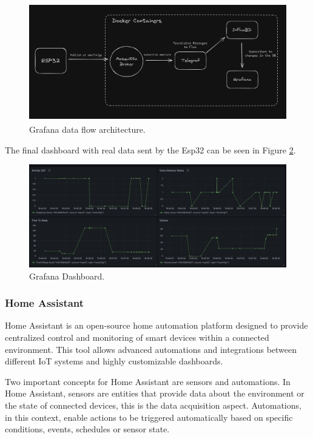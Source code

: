 \begin{figure}[H]
    \centering
    \includegraphics*[scale = 0.28]{Images/GrafanaComArch.png}
    \caption{Grafana data flow architecture\textsuperscript{\cite{Coelhomatias_2024}}.}
    \label{fig:GrafanaComArch}
\end{figure}

The final dashboard with real data sent by the Esp32 can be seen in Figure \ref{fig:GrafanaDashboard}.

\begin{figure}[H]
    \centering
    \includegraphics*[scale = 0.3]{Images/GrafanaDashboard.png}
    \caption{Grafana Dashboard.}
    \label{fig:GrafanaDashboard}
\end{figure}

\subsubsection{Home Assistant}

Home Assistant is an open-source home automation platform designed to provide centralized control and monitoring of smart devices within a connected environment. This tool allows advanced automations and integrations between different IoT systems and highly customizable dashboards.

Two important concepts for Home Assistant are sensors and automations. In Home Assistant, sensors are entities that provide data about the environment or the state of connected devices, this is the data acquisition aspect. Automations, in this context, enable actions to be triggered automatically based on specific conditions, events, schedules or sensor state.

